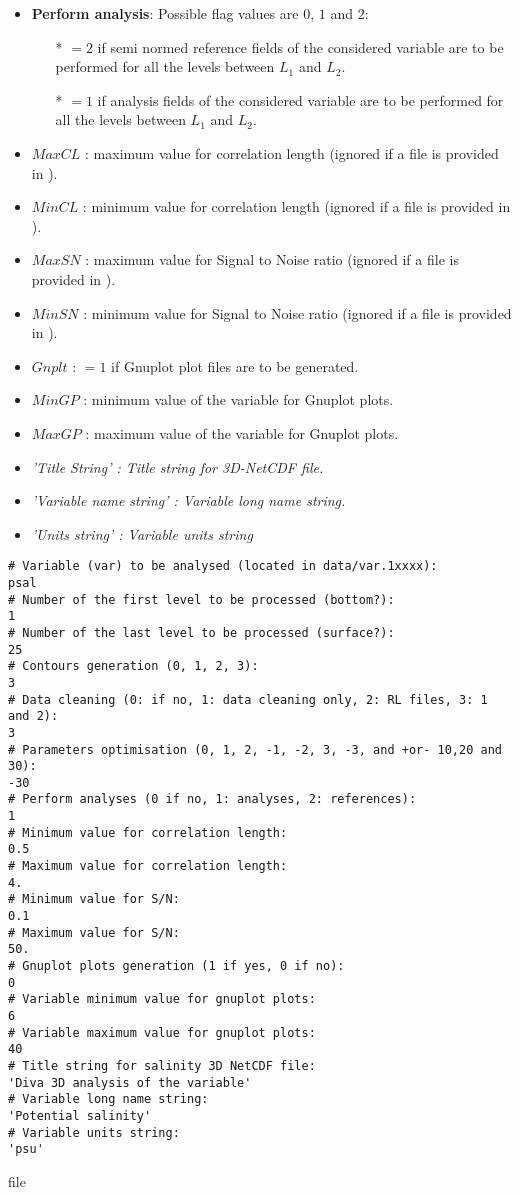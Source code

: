 \begin{itemize}
\item {\bf Perform analysis}: Possible flag values are $0$, $1$ and $2$:
              \begin{itemize}
                \item[*] $=2$ if semi normed reference fields of the considered variable are to be performed for all the levels between $L_1$ and $L_2$.
                \item[*] $=1$ if analysis fields of the considered variable are to be performed for all the levels between $L_1$ and $L_2$.
              \end{itemize}
\item $MaxCL$ : maximum value for correlation length (ignored if a  file is provided in ).
\item $MinCL$ : minimum value for correlation length  (ignored if a  file is provided in ).
\item $MaxSN$ : maximum value for Signal to Noise ratio (ignored if a  file is provided in ).
\item $MinSN$ : minimum value for Signal to Noise ratio (ignored if a  file is provided in ).
\item $Gnplt$ : $=1$ if Gnuplot plot files are to be generated.
\item $MinGP$ : minimum value of the variable for Gnuplot plots.
\item $MaxGP$ : maximum value of the variable for Gnuplot plots.
\item \it{'Title String'} : Title string for 3D-NetCDF file.
\item \it{'Variable name string'} : Variable long name string.
\item \it{'Units string'} : Variable units string
\end{itemize}


\begin{exfile}[H] %
\begin{footnotesize}
\begin{verbatim}
# Variable (var) to be analysed (located in data/var.1xxxx):
psal
# Number of the first level to be processed (bottom?):
1
# Number of the last level to be processed (surface?):
25
# Contours generation (0, 1, 2, 3):
3
# Data cleaning (0: if no, 1: data cleaning only, 2: RL files, 3: 1 and 2):
3
# Parameters optimisation (0, 1, 2, -1, -2, 3, -3, and +or- 10,20 and 30):
-30
# Perform analyses (0 if no, 1: analyses, 2: references):
1
# Minimum value for correlation length:
0.5
# Maximum value for correlation length:
4.
# Minimum value for S/N:
0.1
# Maximum value for S/N:
50.
# Gnuplot plots generation (1 if yes, 0 if no):
0
# Variable minimum value for gnuplot plots:
6
# Variable maximum value for gnuplot plots:
40
# Title string for salinity 3D NetCDF file:
'Diva 3D analysis of the variable'
# Variable long name string:
'Potential salinity'
# Variable units string:
'psu'
\end{verbatim}
\end{footnotesize}
\caption{ file}
\label{3Dinfotfile}
\end{exfile}

